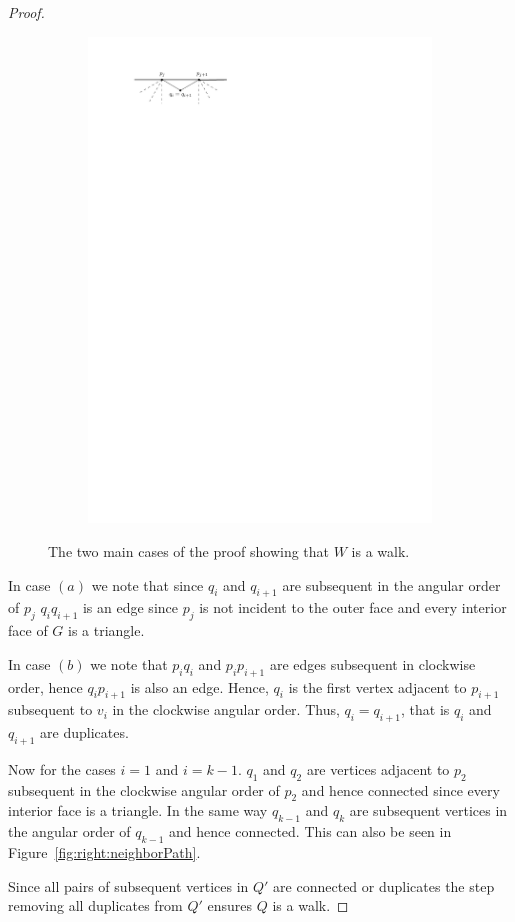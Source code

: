 \begin{proof}
\begin{figure}[t]
\begin{subfigure}[t]{0.4\linewidth}
            \includegraphics[]{unifiedAlgo/img/walkProofB}
            \caption{}
        \end{subfigure}
        \caption{The two main cases of the proof showing that $W$ is a walk.}
        \label{fig:uni:walkproof}
      \end{figure}

      In case $(a)$ we note that since $q_i$ and $q_{i+1}$ are subsequent in the angular order of $p_j$ $q_i q_{i+1}$ is an edge since $p_j$ is not incident to the outer face and every interior face of $G$ is a triangle.

      In case $(b)$ we note that $p_i q_i$ and $p_i p_{i+1}$ are edges subsequent in clockwise order, hence $q_{i} p_{i+1}$ is also an edge. Hence, $q_i$ is the first vertex adjacent to $p_{i+1}$ subsequent to $v_i$ in the clockwise angular order. Thus, $q_{i} = q_{i+1}$, that is $q_i$ and $q_{i+1}$ are duplicates.

      Now for the cases $i=1$ and $i=k-1$. $q_1$ and $q_2$ are vertices adjacent to $p_{2}$ subsequent in the clockwise angular order of ${p_2}$ and hence connected since every interior face is a triangle. In the same way $q_{k-1}$ and $q_k$ are subsequent vertices in the angular order of $q_{k-1}$ and hence connected. This can also be seen in Figure~\ref{fig:right:neighborPath}.

      Since all pairs of subsequent vertices in $Q'$ are connected or duplicates the step removing all duplicates from $Q'$ ensures $Q$ is a walk.
    \end{proof}

